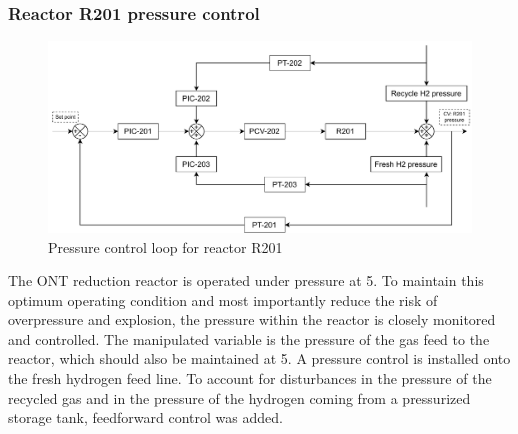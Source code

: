 \subsubsection{Reactor R201 pressure control} %
\begin{figure}
    \centering
    \includegraphics[width=\linewidth]{chapters/4-operation-control/4-Figures/R201-PC.pdf}
    \caption{Pressure control loop for reactor R201}
    \label{fig:R201-PC}
\end{figure}
The ONT reduction reactor is operated under pressure at \SI{5}{\atm}. To maintain this optimum operating condition and most importantly reduce the risk of overpressure and explosion, the pressure within the reactor is closely monitored and controlled. The manipulated variable is the pressure of the gas feed to the reactor, which should also be maintained at \SI{5}{\atm}. A pressure control is installed onto the fresh hydrogen feed line. To account for disturbances in the pressure of the recycled gas and in the pressure of the hydrogen coming from a pressurized storage tank, feedforward control was added. 



